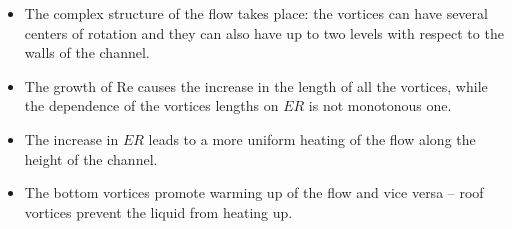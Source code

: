 \begin{itemize}



\item[1.] The complex structure of the flow takes place: the vortices can have several centers of rotation and they can also have up to two levels with respect to the walls of the channel.



\item[2.] The growth of {\sf Re} causes the increase in the length of all the vortices, while the dependence of the vortices lengths on $ER$ is not monotonous one.



\item[3.] The increase in $ER$ leads to a more uniform heating of the flow along the height of the channel.



\item[4.] The bottom vortices promote warming up of the flow and vice versa -- roof vortices prevent the liquid from heating up.





\end{itemize}










\EngRef

